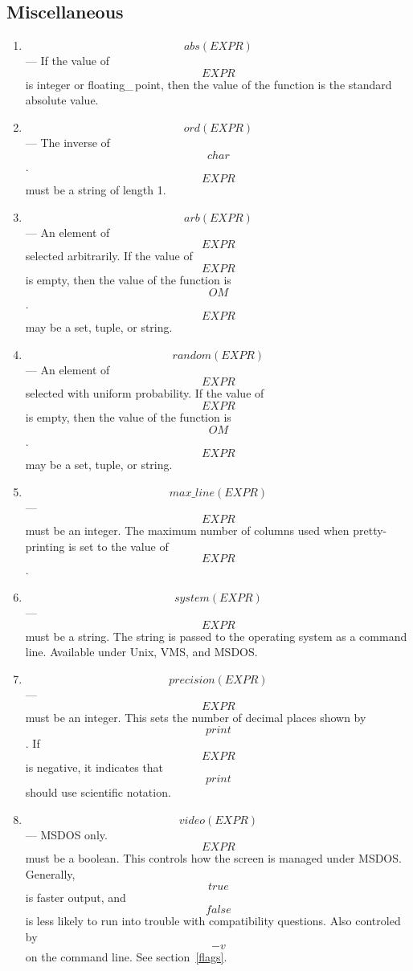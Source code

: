 {\pagebreak[0]
\subsection{Miscellaneous}

\begin{enumerate}


\item
\[abs(EXPR)\] ---  If the value of \[EXPR\] is 
integer or floating\_\,point, then
the value of the function is the standard absolute value.  

\item
\[ord(EXPR)\] ---
The inverse of \[char\].
\[EXPR\] must be a string of length 1.

\item
\[arb(EXPR)\] ---  An element of \[EXPR\] selected arbitrarily.
If the value of \[EXPR\] is empty,
then the value of the function is \[OM\]\@.
\[EXPR\] may be a set, tuple, or string.

\item
\[random(EXPR)\] ---
An element of \[EXPR\] selected with uniform probability.
If the value of \[EXPR\] is empty,
then the value of the function is \[OM\]\@.
\[EXPR\] may be a set, tuple, or string.

\item
\[max\_line(EXPR)\] ---
\[EXPR\] must be an integer.
The maximum number of columns used when pretty-printing is set to the
value of \[EXPR\].

\item
\[system(EXPR)\] ---
\[EXPR\] must be a string.
The string is passed to the operating system as a command line.
Available under Unix, VMS, and MSDOS.

\item
\[precision(EXPR)\] ---
\[EXPR\] must be an integer.
This sets the number of decimal places shown by \[print\].
If \[EXPR\] is negative, it indicates that \[print\] should use
scientific notation.

\item
\[video(EXPR)\] ---
MSDOS only.
\[EXPR\] must be a boolean.
This controls how the screen is managed under MSDOS.
Generally,  \[true\] is faster output, and \[false\] is less likely to
run into trouble with compatibility questions.
Also controled by \[-v\] on the command line.  See section~\ref{flags}.

\end{enumerate}

}
